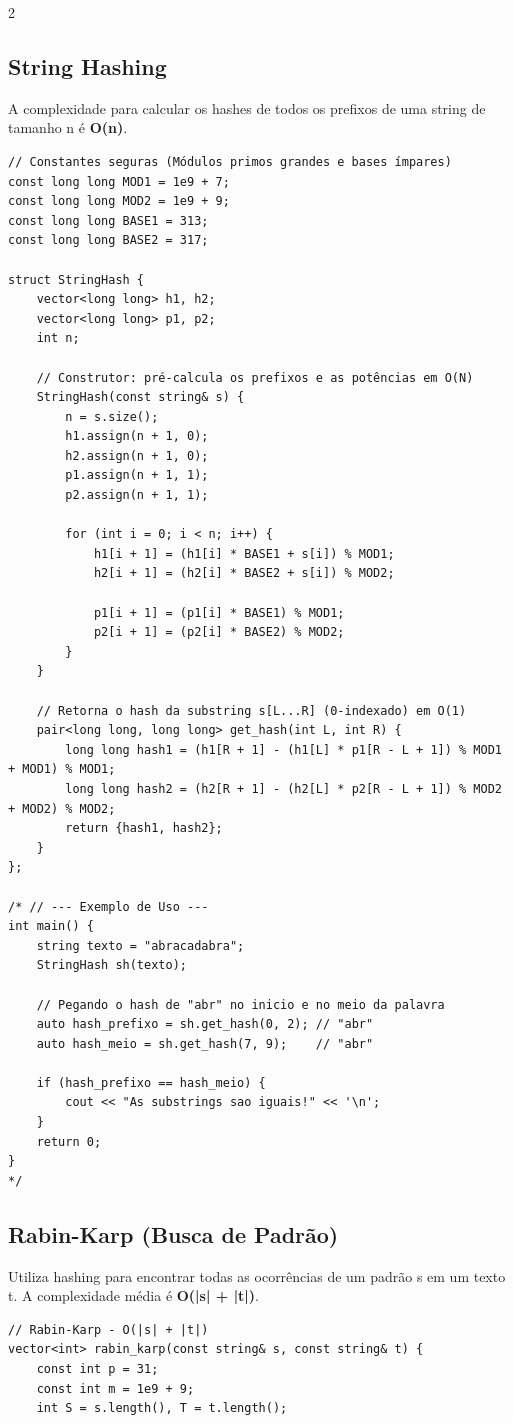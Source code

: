 \documentclass[11pt]{article}
\begin{document}
\begin{multicols}{2}
\subsection{String Hashing}
A complexidade para calcular os hashes de todos os prefixos de uma string de tamanho n é \textbf{O(n)}.
\begin{lstlisting}
// Constantes seguras (Módulos primos grandes e bases ímpares)
const long long MOD1 = 1e9 + 7;
const long long MOD2 = 1e9 + 9;
const long long BASE1 = 313;
const long long BASE2 = 317;

struct StringHash {
    vector<long long> h1, h2;
    vector<long long> p1, p2;
    int n;

    // Construtor: pré-calcula os prefixos e as potências em O(N)
    StringHash(const string& s) {
        n = s.size();
        h1.assign(n + 1, 0);
        h2.assign(n + 1, 0);
        p1.assign(n + 1, 1);
        p2.assign(n + 1, 1);

        for (int i = 0; i < n; i++) {
            h1[i + 1] = (h1[i] * BASE1 + s[i]) % MOD1;
            h2[i + 1] = (h2[i] * BASE2 + s[i]) % MOD2;
            
            p1[i + 1] = (p1[i] * BASE1) % MOD1;
            p2[i + 1] = (p2[i] * BASE2) % MOD2;
        }
    }

    // Retorna o hash da substring s[L...R] (0-indexado) em O(1)
    pair<long long, long long> get_hash(int L, int R) {
        long long hash1 = (h1[R + 1] - (h1[L] * p1[R - L + 1]) % MOD1 + MOD1) % MOD1;
        long long hash2 = (h2[R + 1] - (h2[L] * p2[R - L + 1]) % MOD2 + MOD2) % MOD2;
        return {hash1, hash2};
    }
};

/* // --- Exemplo de Uso ---
int main() {
    string texto = "abracadabra";
    StringHash sh(texto);

    // Pegando o hash de "abr" no inicio e no meio da palavra
    auto hash_prefixo = sh.get_hash(0, 2); // "abr"
    auto hash_meio = sh.get_hash(7, 9);    // "abr"

    if (hash_prefixo == hash_meio) {
        cout << "As substrings sao iguais!" << '\n';
    }
    return 0;
}
*/
\end{lstlisting}

\subsection{Rabin-Karp (Busca de Padrão)}
Utiliza hashing para encontrar todas as ocorrências de um padrão s em um texto t. A complexidade média é \textbf{O(|s| + |t|)}.
\begin{lstlisting}
// Rabin-Karp - O(|s| + |t|)
vector<int> rabin_karp(const string& s, const string& t) {
    const int p = 31;
    const int m = 1e9 + 9;
    int S = s.length(), T = t.length();


\end{lstlisting}
\end{multicols}
\end{document}
